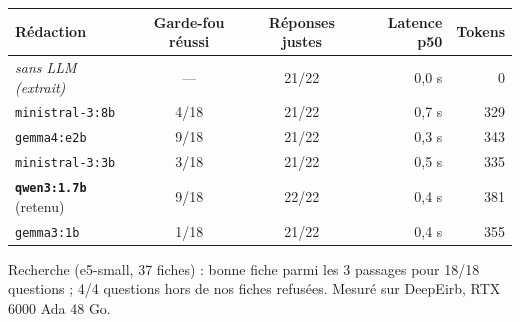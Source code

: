 \scriptsize
\begin{tabular}{@{}l c c r r@{}}
\toprule
\textbf{Rédaction} & \textbf{Garde-fou réussi} & \textbf{Réponses justes} & \textbf{Latence p50} & \textbf{Tokens} \\
\midrule
\textit{sans LLM (extrait)} & --- & 21/22 & 0,0 s & 0 \\
\texttt{ministral-3:8b} & 4/18 & 21/22 & 0,7 s & 329 \\
\texttt{gemma4:e2b} & 9/18 & 21/22 & 0,3 s & 343 \\
\texttt{ministral-3:3b} & 3/18 & 21/22 & 0,5 s & 335 \\
\textbf{\texttt{qwen3:1.7b}} \textcolor{okgreen}{(retenu)} & 9/18 & 22/22 & 0,4 s & 381 \\
\texttt{gemma3:1b} & 1/18 & 21/22 & 0,4 s & 355 \\
\bottomrule
\end{tabular}

\smallskip
{\tiny Recherche (e5-small, 37 fiches) : bonne fiche parmi les 3 passages pour 18/18 questions ; 4/4 questions hors de nos fiches refusées. Mesuré sur DeepEirb, RTX 6000 Ada 48 Go.}
